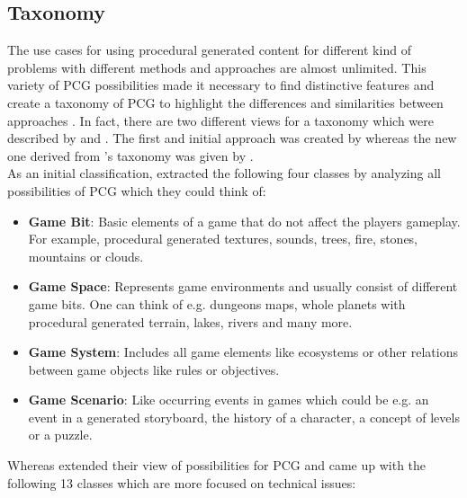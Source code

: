 \documentclass[MGS,Master,english]{twbook}%
\begin{document}
\subsection{Taxonomy}\label{PcgTaxonomy}
The use cases for using procedural generated content for different kind of problems with different methods and approaches are almost unlimited. This variety of PCG possibilities made it necessary to find distinctive features and create a taxonomy of PCG to highlight the differences and similarities between approaches \cite{pcg::book}. In fact, there are two different views for a taxonomy which were described by \cite{pcg::survey} and \cite{pcg::book}. The first and initial approach was created by \cite{pcg::survey} whereas the new one derived from \cite{pcg::survey}'s taxonomy was given by \cite{pcg::book}.\\
As an initial classification, \cite{pcg::survey} extracted the following four classes by analyzing all possibilities of PCG which they could think of:
\begin{itemize}
	\item \textbf{Game Bit}: Basic elements of a game that do not affect the players gameplay. For example, procedural generated textures, sounds, trees, fire, stones, mountains or clouds. \cite{pcg::survey}
	\item \textbf{Game Space}: Represents game environments and usually consist of different game bits. One can think of e.g. dungeons maps, whole planets with procedural generated terrain, lakes, rivers and many more. \cite{pcg::survey}
	\item \textbf{Game System}: Includes all game elements like ecosystems or other relations between game objects like rules or objectives. \cite{pcg::survey}
	\item \textbf{Game Scenario}: Like occurring events in games which could be e.g. an event in a generated storyboard, the history of a character, a concept of levels or a puzzle. \cite{pcg::survey}
\end{itemize}
Whereas \cite{pcg::book} extended their view of possibilities for PCG and came up with the following 13 classes which are more focused on technical issues:
\end{document}
